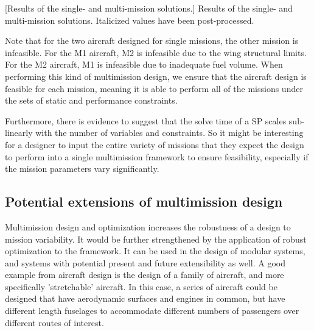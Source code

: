 \begin{center}
    [Results of the single- and multi-mission solutions.] {Results of the single-
    and multi-mission solutions. Italicized values have been post-processed.}
    
    \label{t:mmoutputs}
\end{center}

Note that for the two aircraft designed for single missions, the other mission is infeasible. For the M1 aircraft,
M2 is infeasible due to the wing structural limits. For the M2 aircraft, M1 is infeasible due to inadequate
fuel volume. When performing this kind of multimission design, we ensure that the aircraft design is
feasible for each mission,
meaning it is able to perform all of the missions under the sets of static and performance constraints.

Furthermore, there is evidence to suggest that the solve time of a \gls{SP} scales sub-linearly with the number of
variables and constraints. So it might be interesting for a designer to input the entire variety of missions that
they expect the design to perform into a single multimission framework to ensure feasibility, especially if the
mission parameters vary significantly.

\subsection{Potential extensions of multimission design}

Multimission design and optimization increases the robustness of a design to mission variability.
It would be further strengthened by the application of robust optimization to the framework. It can be used in the design
of modular systems, and systems with potential present and future extensibility as well.
A good example from aircraft design
is the design of a family of aircraft, and more specifically 'stretchable' aircraft. In
this case, a series of aircraft could be designed that have aerodynamic surfaces and engines
in common, but have different length fuselages to accommodate different numbers of passengers over different
routes of interest.

